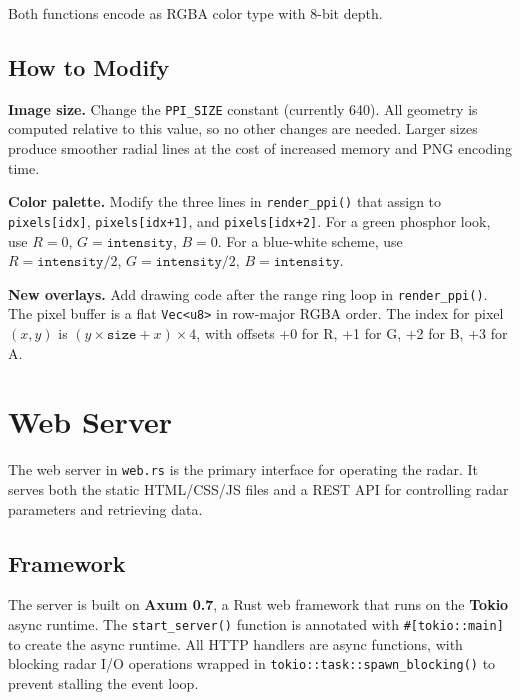 \documentclass[11pt,letterpaper]{article}
\begin{document}
Both functions encode as RGBA color type with 8-bit depth.

\subsection{How to Modify}
\label{subsec:ppi-how-to-modify}

\textbf{Image size.} Change the \texttt{PPI\_SIZE} constant (currently 640). All geometry is computed relative to this value, so no other changes are needed. Larger sizes produce smoother radial lines at the cost of increased memory and PNG encoding time.

\textbf{Color palette.} Modify the three lines in \texttt{render\_ppi()} that assign to \texttt{pixels[idx]}, \texttt{pixels[idx+1]}, and \texttt{pixels[idx+2]}. For a green phosphor look, use $R = 0$, $G = \texttt{intensity}$, $B = 0$. For a blue-white scheme, use $R = \texttt{intensity}/2$, $G = \texttt{intensity}/2$, $B = \texttt{intensity}$.

\textbf{New overlays.} Add drawing code after the range ring loop in \texttt{render\_ppi()}. The pixel buffer is a flat \texttt{Vec<u8>} in row-major RGBA order. The index for pixel $(x, y)$ is $(y \times \texttt{size} + x) \times 4$, with offsets +0 for R, +1 for G, +2 for B, +3 for A.


\newpage
\section{Web Server}
\label{sec:web-server}

The web server in \texttt{web.rs} is the primary interface for operating the radar. It serves both the static HTML/CSS/JS files and a REST API for controlling radar parameters and retrieving data.

\subsection{Framework}
\label{subsec:web-framework}

The server is built on \textbf{Axum 0.7}, a Rust web framework that runs on the \textbf{Tokio} async runtime. The \texttt{start\_server()} function is annotated with \texttt{\#[tokio::main]} to create the async runtime. All HTTP handlers are async functions, with blocking radar I/O operations wrapped in \texttt{tokio::task::spawn\_blocking()} to prevent stalling the event loop.
\end{document}

